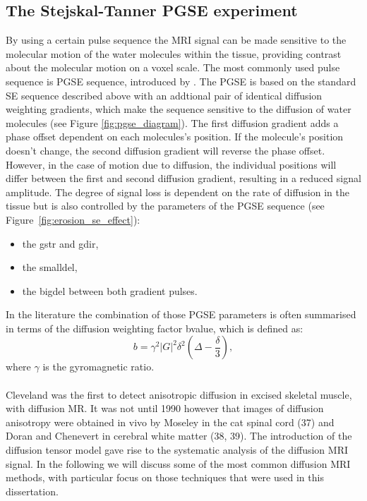 \subsection*{The Stejskal-Tanner PGSE experiment}
By using a certain pulse sequence the MRI signal can be made sensitive to the molecular motion of the water molecules within the tissue, providing contrast about the molecular motion on a voxel scale. The most commonly used pulse sequence is {\gls{PGSE}} sequence, introduced by \citep{Stejskal:1966}. The {\gls{PGSE}} is based on the standard SE sequence described above with an addtional pair of identical diffusion weighting gradients, which make the sequence sensitive to the diffusion of water molecules (see Figure \ref{fig:pgse_diagram}). The first diffusion gradient adds a phase offset dependent on each molecules's position. If the molecule's position doesn't change, the second diffusion gradient will reverse the phase offset. However, in the case of motion due to diffusion, the individual positions will differ between the first and second diffusion gradient, resulting in a reduced signal amplitude. The degree of signal loss is dependent on the rate of diffusion in the tissue but is also controlled by the parameters of the {\gls{PGSE}} sequence (see Figure~\ref{fig:erosion_se_effect}):
\begin{itemize}
	\item the {\gls{gstr}} and {\gls{gdir}},
	\item the {\gls{smalldel}},
	\item the {\gls{bigdel}} between both gradient pulses.
\end{itemize}

In the literature the combination of those PGSE parameters is often summarised in terms of the diffusion weighting factor {\gls{bvalue}}, which is defined as:
\begin{equation}
	b = \gamma^2|G|^2\delta^2(\Delta-\frac{\delta}{3}),
    \label{eq:bvalue}
\end{equation}
where $\gamma$ is the gyromagnetic ratio.

\paragraph{}
Cleveland \citep{Cleveland:XXX} was the first to detect anisotropic diffusion in excised skeletal muscle, with diffusion MR. It was not until 1990 however that images of diffusion anisotropy were obtained in vivo by Moseley in the cat spinal cord (37) and Doran and Chenevert in cerebral white matter (38, 39). The introduction of the diffusion tensor model gave rise to the systematic analysis of the diffusion MRI signal. In the following we will discuss some of the most common diffusion MRI methods, with particular focus on those techniques that were used in this dissertation. 

